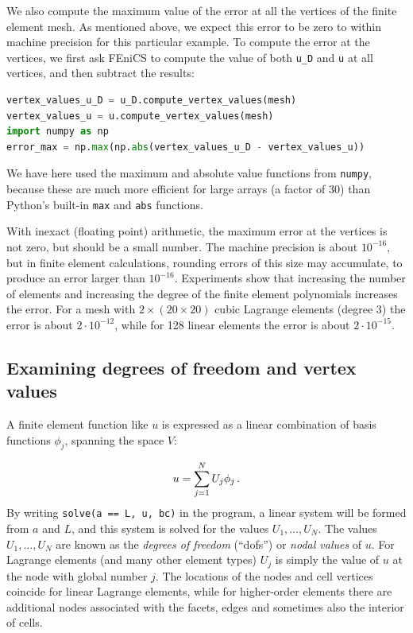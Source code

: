 \documentclass[graybox,envcountchap,sectrefs,final]{svmonodo}
\newenvironment{notice_mdfboxadmon}[1][]{
\begin{notice_mdfboxmdframed}[frametitle=#1]
}
{
\end{notice_mdfboxmdframed}
}
\begin{document}
We also compute the maximum value of the error at all the vertices of
the finite element mesh. As mentioned above, we expect this error to
be zero to within machine precision for this particular example. To
compute the error at the vertices, we first ask FEniCS to compute the
value of both \Verb!u_D! and \texttt{u} at all vertices, and then subtract the
results:

\begin{lstlisting}[language=Python,style=graycolor]
vertex_values_u_D = u_D.compute_vertex_values(mesh)
vertex_values_u = u.compute_vertex_values(mesh)
import numpy as np
error_max = np.max(np.abs(vertex_values_u_D - vertex_values_u))
\end{lstlisting}
We have here used the maximum and absolute value functions from \texttt{numpy},
because these are much more efficient for large arrays (a factor of 30)
than Python's built-in \texttt{max} and \texttt{abs} functions.



\begin{notice_mdfboxadmon}
With inexact (floating point) arithmetic, the maximum
error at the vertices is not zero, but should be a small number. The
machine precision is about $10^{-16}$, but in finite element
calculations, rounding errors of this size may accumulate, to produce
an error larger than $10^{-16}$. Experiments show that increasing the
number of elements and increasing the degree of the finite element
polynomials increases the error. For a mesh with $2\times(20\times
20)$ cubic Lagrange elements (degree 3) the error is about $2\cdot
10^{-12}$, while for 128 linear elements the error is about $2\cdot
10^{-15}$.
\end{notice_mdfboxadmon} %

\subsection{Examining degrees of freedom and vertex values}
\label{ch:poisson0:impl:dofmap}


A finite element function like $u$ is expressed as a linear combination
of basis functions $\phi_j$, spanning the space $V$:

\begin{equation}
u = \sum_{j=1}^N U_j \phi_j \label{ch:poisson0:ufem}\tp
\end{equation}
By writing \texttt{solve(a == L, u, bc)} in the program, a linear system will
be formed from $a$ and $L$, and this system is solved for the
values $U_1,\ldots,U_N$. The values $U_1,\ldots,U_N$ are known as the
\emph{degrees of freedom} (``dofs'') or \emph{nodal values} of $u$. For Lagrange
elements (and many other element types) $U_j$ is simply the value of
$u$ at the node with global number $j$. The locations of the nodes and
cell vertices coincide for linear Lagrange elements, while for
higher-order elements there are additional nodes associated with the
facets, edges and sometimes also the interior of cells.
\end{document}
